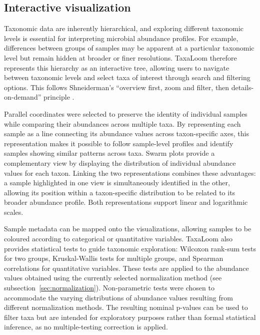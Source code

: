 \documentclass[pdflatex,sn-vancouver-num]{sn-jnl}%
\theoremstyle{thmstyleone}%
\theoremstyle{thmstyletwo}%
\theoremstyle{thmstylethree}%
\begin{document}
\subsection{Interactive visualization}



Taxonomic data are inherently hierarchical, and exploring different taxonomic levels is essential for interpreting microbial abundance profiles. For example, differences between groups of samples may be apparent at a particular taxonomic level but remain hidden at broader or finer resolutions. TaxaLoom therefore represents this hierarchy as an interactive tree, allowing users to navigate between taxonomic levels and select taxa of interest through search and filtering options. This follows Shneiderman's ``overview first, zoom and filter, then details-on-demand'' principle \citep{shneiderman_eyes_1996}.

Parallel coordinates were selected to preserve the identity of individual samples while comparing their abundances across multiple taxa. By representing each sample as a line connecting its abundance values across taxon-specific axes, this representation makes it possible to follow sample-level profiles and identify samples showing similar patterns across taxa. Swarm plots provide a complementary view by displaying the distribution of individual abundance values for each taxon. Linking the two representations combines these advantages: a sample highlighted in one view is simultaneously identified in the other, allowing its position within a taxon-specific distribution to be related to its broader abundance profile. Both representations support linear and logarithmic scales.


Sample metadata can be mapped onto the visualizations, allowing samples to be coloured according to categorical or quantitative variables. TaxaLoom also provides statistical tests to guide taxonomic exploration: Wilcoxon rank-sum tests for two groups, Kruskal-Wallis tests for multiple groups, and Spearman correlations for quantitative variables. These tests are applied to the abundance values obtained using the currently selected normalization method (see subsection~\ref{sec:normalization}). Non-parametric tests were chosen to accommodate the varying distributions of abundance values resulting from different normalization methods. The resulting nominal p-values can be used to filter taxa but are intended for exploratory purposes rather than formal statistical inference, as no multiple-testing correction is applied.
\end{document}

